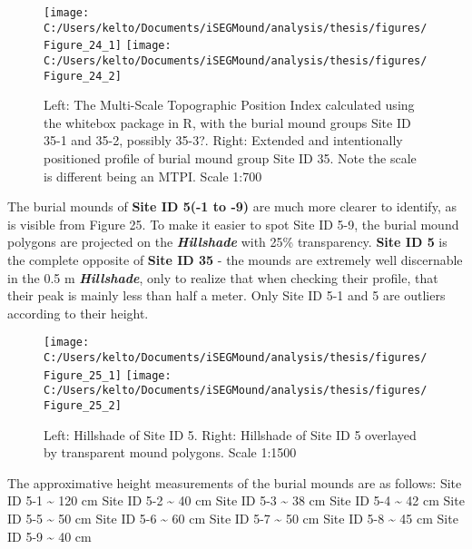 \documentclass[
  12pt,
]{article}
\begin{document}
\begin{figure}
\texttt{[image: C:/Users/kelto/Documents/iSEGMound/analysis/thesis/figures/Figure\_24\_1]} \texttt{[image: C:/Users/kelto/Documents/iSEGMound/analysis/thesis/figures/Figure\_24\_2]} \caption{Left: The Multi-Scale Topographic Position Index calculated using the whitebox package in R, with the burial mound groups Site ID 35-1 and 35-2, possibly 35-3?. Right: Extended and intentionally positioned profile of burial mound group Site ID 35. Note the scale is different being an MTPI. Scale 1:700}\label{fig:Figure24}
\end{figure}

The burial mounds of \textbf{Site ID 5(-1 to -9)} are much more clearer to identify, as is visible from Figure 25. To make it easier to spot Site ID 5-9, the burial mound polygons are projected on the \textbf{\emph{Hillshade}} with 25\% transparency. \textbf{Site ID 5} is the complete opposite of \textbf{Site ID 35} - the mounds are extremely well discernable in the 0.5 m \textbf{\emph{Hillshade}}, only to realize that when checking their profile, that their peak is mainly less than half a meter. Only Site ID 5-1 and 5 are outliers according to their height.

\begin{figure}
\texttt{[image: C:/Users/kelto/Documents/iSEGMound/analysis/thesis/figures/Figure\_25\_1]} \texttt{[image: C:/Users/kelto/Documents/iSEGMound/analysis/thesis/figures/Figure\_25\_2]} \caption{Left: Hillshade of Site ID 5. Right: Hillshade of Site ID 5 overlayed by transparent mound polygons. Scale 1:1500}\label{fig:Figure25}
\end{figure}

The approximative height measurements of the burial mounds are as follows:
Site ID 5-1 \textasciitilde{} 120 cm
\newline
Site ID 5-2 \textasciitilde{} 40 cm
\newline
Site ID 5-3 \textasciitilde{} 38 cm
\newline
Site ID 5-4 \textasciitilde{} 42 cm
\newline
Site ID 5-5 \textasciitilde{} 50 cm
\newline
Site ID 5-6 \textasciitilde{} 60 cm
\newline
Site ID 5-7 \textasciitilde{} 50 cm
\newline
Site ID 5-8 \textasciitilde{} 45 cm
\newline
Site ID 5-9 \textasciitilde{} 40 cm
\end{document}
